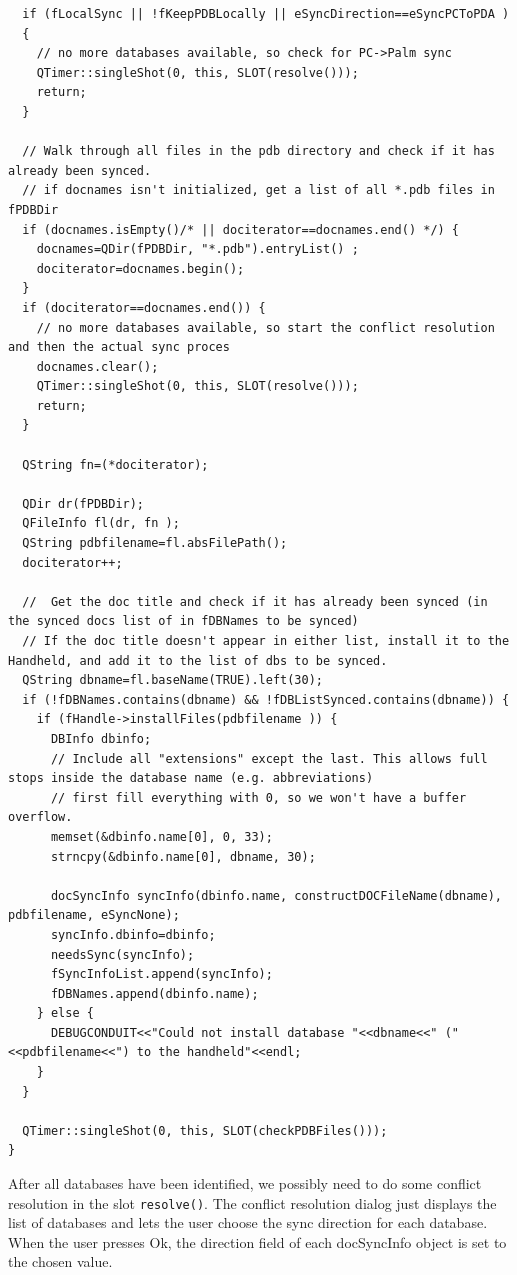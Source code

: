 \documentclass[10pt,a4paper]{article}
\newcommand{\code}[1]{{\small\texttt{#1}}}
\begin{document}
{\begin{verbatim}
  if (fLocalSync || !fKeepPDBLocally || eSyncDirection==eSyncPCToPDA )
  {
    // no more databases available, so check for PC->Palm sync
    QTimer::singleShot(0, this, SLOT(resolve()));
    return;
  }
  
  // Walk through all files in the pdb directory and check if it has already been synced.
  // if docnames isn't initialized, get a list of all *.pdb files in fPDBDir
  if (docnames.isEmpty()/* || dociterator==docnames.end() */) {
    docnames=QDir(fPDBDir, "*.pdb").entryList() ;
    dociterator=docnames.begin();
  }
  if (dociterator==docnames.end()) {
    // no more databases available, so start the conflict resolution and then the actual sync proces
    docnames.clear();
    QTimer::singleShot(0, this, SLOT(resolve()));
    return;
  }

  QString fn=(*dociterator);

  QDir dr(fPDBDir);
  QFileInfo fl(dr, fn );
  QString pdbfilename=fl.absFilePath();
  dociterator++;
  
  //  Get the doc title and check if it has already been synced (in the synced docs list of in fDBNames to be synced)
  // If the doc title doesn't appear in either list, install it to the Handheld, and add it to the list of dbs to be synced.
  QString dbname=fl.baseName(TRUE).left(30);
  if (!fDBNames.contains(dbname) && !fDBListSynced.contains(dbname)) {
    if (fHandle->installFiles(pdbfilename )) {
      DBInfo dbinfo;
      // Include all "extensions" except the last. This allows full stops inside the database name (e.g. abbreviations)
      // first fill everything with 0, so we won't have a buffer overflow.
      memset(&dbinfo.name[0], 0, 33);
      strncpy(&dbinfo.name[0], dbname, 30);

      docSyncInfo syncInfo(dbinfo.name, constructDOCFileName(dbname), pdbfilename, eSyncNone);
      syncInfo.dbinfo=dbinfo;
      needsSync(syncInfo);
      fSyncInfoList.append(syncInfo);
      fDBNames.append(dbinfo.name);
    } else {
      DEBUGCONDUIT<<"Could not install database "<<dbname<<" ("<<pdbfilename<<") to the handheld"<<endl;
    }
  }
  
  QTimer::singleShot(0, this, SLOT(checkPDBFiles()));
}
\end{verbatim}
}

After all databases have been identified, we possibly need to do some conflict resolution in the slot \code{resolve()}. The conflict resolution dialog just displays the list of databases and lets the user choose the sync direction for each database. When the user presses Ok, the direction field of each docSyncInfo object is set to the chosen value.
\end{document}
